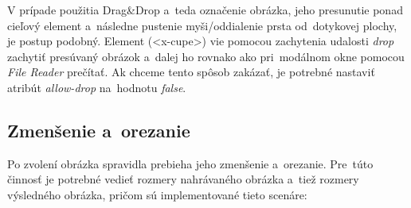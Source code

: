 V prípade použitia Drag&Drop a~teda označenie obrázka, jeho presunutie ponad cieľový element a~následne pustenie myši/oddialenie prsta od~dotykovej plochy, je postup podobný. Element (<x-cupe>) vie pomocou zachytenia udalosti \emph{drop} zachytiť presúvaný obrázok a~dalej ho rovnako ako pri~modálnom okne pomocou \emph{File Reader} prečítať. Ak chceme tento spôsob zakázať, je potrebné nastaviť atribút \emph{allow-drop} na~hodnotu \emph{false}.

\subsection{Zmenšenie a~orezanie}

Po zvolení obrázka spravidla prebieha jeho zmenšenie a~orezanie. Pre~túto činnosť je potrebné vedieť rozmery nahrávaného obrázka a~tiež rozmery výsledného obrázka, pričom sú implementované tieto scenáre:

